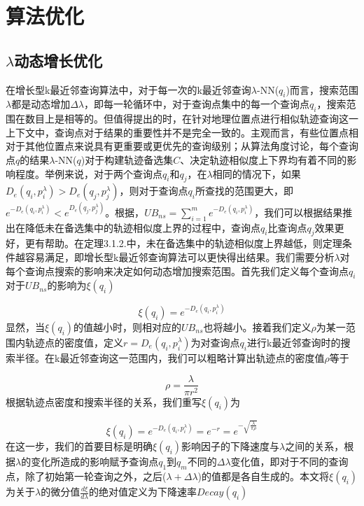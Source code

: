 \section{算法优化}
\label{sec:optimization}

\subsection{$\lambda$动态增长优化}
\label{subsec:lambda}

在增长型k最近邻查询算法中，对于每一次的k最近邻查询$\lambda$-NN($q_{i}$)而言，搜索范围$\lambda$都是动态增加$\Delta\lambda$，即每一轮循环中，对于查询点集中的每一个查询点$q_{i}$，搜索范围在数目上是相等的。但值得提出的时，在针对地理位置点进行相似轨迹查询这一上下文中，查询点对于结果的重要性并不是完全一致的。主观而言，有些位置点相对于其他位置点来说具有更重要或更优先的查询级别；从算法角度讨论，每个查询点$q$的结果$\lambda$-NN($q$)对于构建轨迹备选集$C$、决定轨迹相似度上下界均有着不同的影响程度。举例来说，对于两个查询点$q_{i}$和$q_{j}$，在$\lambda$相同的情况下，如果$D_{e}(q_{i}, p_{i}^{\lambda}) > D_{e}(q_{j}, p_{j}^{\lambda})$，则对于查询点$q_{i}$所查找的范围更大，即$e^{-D_{e}(q_{i}, p_{i}^{\lambda})} < e^{D_{e}(q_{j}, p_{j}^{\lambda})}$。根据，$UB_{ns} = \sum_{i=1}^{m}e^{-D_{e}(q_{i}, p_{i}^{\lambda})}$，我们可以根据结果推出在降低未在备选集中的轨迹相似度上界的过程中，查询点$q_{i}$比查询点$q_{j}$效果更好，更有帮助。在定理3.1.2.中，未在备选集中的轨迹相似度上界越低，则定理条件越容易满足，即增长型k最近邻查询算法可以更快得出结果。我们需要分析$\lambda$对每个查询点搜索的影响来决定如何动态增加搜索范围。首先我们定义每个查询点$q_i$对于$UB_{ns}$的影响为$\xi (q_i)$

\begin{displaymath}
	\xi (q_i) = e^{-D_{e}(q_i,p_i^\lambda)}
\end{displaymath}
显然，当$\xi (q_i)$的值越小时，则相对应的$UB_{ns}$也将越小。接着我们定义$\rho$为某一范围内轨迹点的密度值，定义$r=D_{e}(q_i,p_i^\lambda)$为对查询点$q_i$进行k最近邻查询时的搜索半径。在k最近邻查询这一范围内，我们可以粗略计算出轨迹点的密度值$\rho$等于

\begin{displaymath}
	\rho = \frac{\lambda}{\pi r^{2}}
\end{displaymath}
根据轨迹点密度和搜索半径的关系，我们重写$\xi (q_i)$为

\begin{displaymath}
	\xi (q_i) = e^{-D_{e}(q_i,p_i^\lambda)} = e^{-r} = e^{-\sqrt{\frac{\lambda}{\pi\rho}}}
\end{displaymath}
在这一步，我们的首要目标是明确$\xi (q_i)$影响因子的下降速度与$\lambda$之间的关系，根据$\lambda$的变化所造成的影响赋予查询点$q_1$到$q_m$不同的$\Delta\lambda$变化值，即对于不同的查询点，除了初始第一轮查询之外，之后($\lambda+\Delta\lambda$)的值都是各自生成的。本文将$\xi (q_i)$为关于$\lambda$的微分值$\frac{d\xi}{d\lambda}$的绝对值定义为下降速率$Decay(q_i)$

